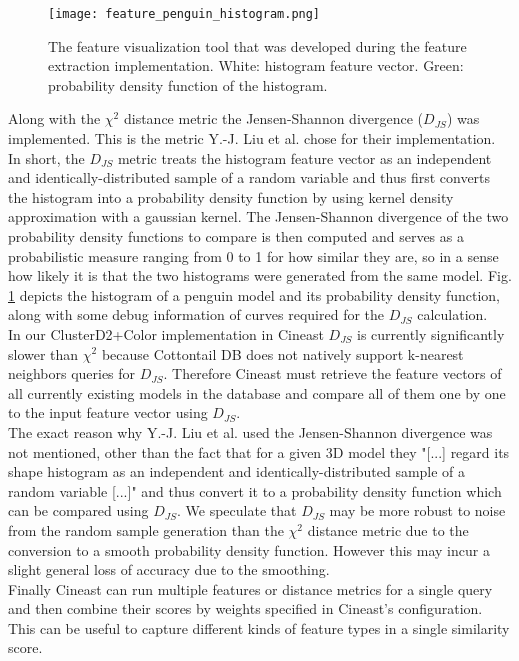 \begin{figure}
\centering
\captionsetup{width=0.8\textwidth}
\texttt{[image: feature\_penguin\_histogram.png]}
\caption{The feature visualization tool that was developed during the feature extraction implementation. White: histogram feature vector. Green: probability density function of the histogram.}
\label{fig:feature_penguin_histogram}
\end{figure}

Along with the $\chi^2$ distance metric the Jensen-Shannon divergence ($D_{JS}$) was implemented. This is the metric Y.-J. Liu et al. \cite{cluster_d2_color} chose for their implementation. In short, the $D_{JS}$ metric treats the histogram feature vector as an independent and identically-distributed sample of a random variable and thus first converts the histogram into a probability density function by using kernel density approximation with a gaussian kernel. The Jensen-Shannon divergence of the two probability density functions to compare is then computed and serves as a probabilistic measure ranging from 0 to 1 for how similar they are, so in a sense how likely it is that the two histograms were generated from the same model. Fig. \ref{fig:feature_penguin_histogram} depicts the histogram of a penguin model and its probability density function, along with some debug information of curves required for the $D_{JS}$ calculation.\\
In our ClusterD2+Color implementation in Cineast $D_{JS}$ is currently significantly slower than $\chi^2$ because Cottontail DB does not natively support k-nearest neighbors queries for $D_{JS}$. Therefore Cineast must retrieve the feature vectors of all currently existing models in the database and compare all of them one by one to the input feature vector using $D_{JS}$.\\
The exact reason why Y.-J. Liu et al. used the Jensen-Shannon divergence was not mentioned, other than the fact that for a given 3D model they "[...] regard its shape histogram as an independent and identically-distributed sample of a random variable [...]" and thus convert it to a probability density function which can be compared using $D_{JS}$. We speculate that $D_{JS}$ may be more robust to noise from the random sample generation than the $\chi^2$ distance metric due to the conversion to a smooth probability density function. However this may incur a slight general loss of accuracy due to the smoothing.\\
Finally Cineast can run multiple features or distance metrics for a single query and then combine their scores by weights specified in Cineast's configuration. This can be useful to capture different kinds of feature types in a single similarity score.


